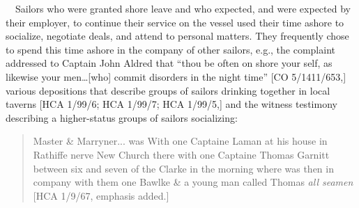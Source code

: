\documentclass[12pt]{article}
\newenvironment{styleStandard}{\renewcommand\baselinestretch{1.0}\setlength\leftskip{0cm}\setlength\rightskip{0cm plus 1fil}\setlength\parindent{0cm}\setlength\parfillskip{0pt plus 1fil}\setlength\parskip{0in plus 1pt}\writerlistparindent\writerlistleftskip\leavevmode\normalfont\normalsize\writerlistlabel\ignorespaces}{\unskip\vspace{0in plus 1pt}\par}
\newcommand\writerlistleftskip{}
\newcommand\writerlistparindent{}
\newcommand\writerlistlabel{}
\begin{document}
\begin{styleStandard}
\ \ Sailors who were granted shore leave and who expected, and were expected by their employer, to continue their service on the vessel used their time ashore to socialize, negotiate deals, and attend to personal matters. They frequently chose to spend this time ashore in the company of other sailors, e.g., the complaint addressed to Captain John Aldred that “thou be often on shore your self, as likewise your men…[who] commit disorders in the night time” [CO 5/1411/653,] various depositions that describe groups of sailors drinking together in local taverns [HCA 1/99/6; HCA 1/99/7; HCA 1/99/5,] and the witness testimony describing a higher-status groups of sailors socializing:
\end{styleStandard}


\begin{quotation}
Master \& Marryner... was With one Captaine Laman at his house in Rathiffe nerve New Church there with one Captaine Thomas Garnitt between six and seven of the Clarke in the morning where was then in company with them one Bawlke \& a young man called Thomas \textit{all seamen} [HCA 1/9/67, emphasis added.] 

\end{quotation}
\end{document}
